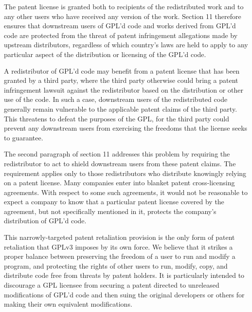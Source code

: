 
The patent license is granted both to recipients of the redistributed work
and to any other users who have received any version of the work. Section 11
therefore ensures that downstream users of GPL'd code and works derived from
GPL'd code are protected from the threat of patent infringement allegations
made by upstream distributors, regardless of which country's laws are held to
apply to any particular aspect of the distribution or licensing of the GPL'd
code.


A redistributor of GPL'd code may benefit from a patent license that has been
granted by a third party, where the third party otherwise could bring a
patent infringement lawsuit against the redistributor based on the
distribution or other use of the code. In such a case, downstream users of
the redistributed code generally remain vulnerable to the applicable patent
claims of the third party. This threatens to defeat the purposes of the GPL,
for the third party could prevent any downstream users from exercising the
freedoms that the license seeks to guarantee.


The second paragraph of section 11 addresses this problem by requiring the
redistributor to act to shield downstream users from these patent claims. The
requirement applies only to those redistributors who distribute knowingly
relying on a patent license. Many companies enter into blanket patent
cross-licensing agreements. With respect to some such agreements, it would
not be reasonable to expect a company to know that a particular patent
license covered by the agreement, but not specifically mentioned in it,
protects the company's distribution of GPL'd code.


This narrowly-targeted patent retaliation provision is the only form of
patent retaliation that GPLv3 imposes by its own force. We believe that it
strikes a proper balance between preserving the freedom of a user to run and
modify a program, and protecting the rights of other users to run, modify,
copy, and distribute code free from threats by patent holders. It is
particularly intended to discourage a GPL licensee from securing a patent
directed to unreleased modifications of GPL'd code and then suing the
original developers or others for making their own equivalent modifications.

